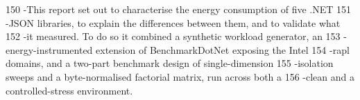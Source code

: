       150 -This report set out to characterise the energy consumption of five .NET                                                                                                                          
      151 -JSON libraries, to explain the differences between them, and to validate what                                                                                                                    
      152 -it measured. To do so it combined a synthetic workload generator, an                                                                                                                             
      153 -energy-instrumented extension of BenchmarkDotNet exposing the Intel                                                                                                                              
      154 -\gls{rapl} domains, and a two-part benchmark design of single-dimension                                                                                                                          
      155 -isolation sweeps and a byte-normalised factorial matrix, run across both a                                                                                                                       
      156 -clean and a controlled-stress environment. 

